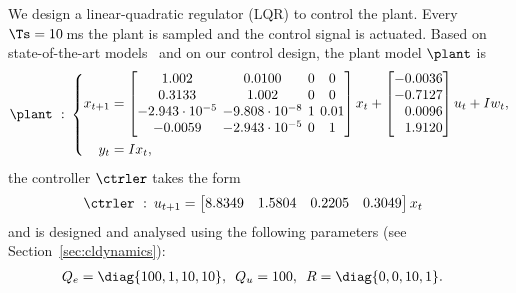 We design a linear-quadratic regulator (LQR) to control the plant. 
Every $\Ts=10\,$ms the plant is sampled and the control signal is actuated.
Based on state-of-the-art models~\cite{Cazzolato:2011} and on our control design, the plant model $\plant$ is
\begin{equation}
    \label{eq:furuta}
    \setlength\arraycolsep{2pt}
    \begin{aligned}
        \plant \,\, : \,\, & \left\{ 
        \begin{aligned}
            x_{t+1} &= 
            \begin{bmatrix*}[c] 
                1.002 & 0.0100 & 0 & 0 \\
                0.3133 & 1.002 & 0 & 0 \\
                -2.943\cdot 10^{-5} & -9.808\cdot 10^{-8} & 1 & 0.01 \\
                -0.0059 & -2.943\cdot 10^{-5} & 0 & 1
            \end{bmatrix*} x_t + 
            \begin{bmatrix*}[c]
                -0.0036 \\
                -0.7127 \\
                \textcolor{white}{+}0.0096 \\
                \textcolor{white}{+}1.9120
            \end{bmatrix*} u_t + I w_t,\\
            y_t &= I x_t, 
        \end{aligned} \right. \\
    \end{aligned}
\end{equation}
the controller $\ctrler$ takes the form
\begin{equation}
    \label{eq:furuta2}
    \begin{aligned}
        \ctrler \,\, : \,\,\, & u_{t+1} = 
        \begin{bmatrix*}[c]
        8.8349 & 1.5804 & 0.2205 & 0.3049
        \end{bmatrix*} x_t 
    \end{aligned}
\end{equation}
and is designed and analysed using the following parameters (see Section~\ref{sec:cldynamics}):
\begin{equation}
    \label{eq:furuta3}
    \begin{aligned}
        Q_e &= \diag{100,1,10,10}, \,\,\, Q_u = 100, \,\,\, R = \diag{0, 0, 10, 1}.
    \end{aligned}
\end{equation}

